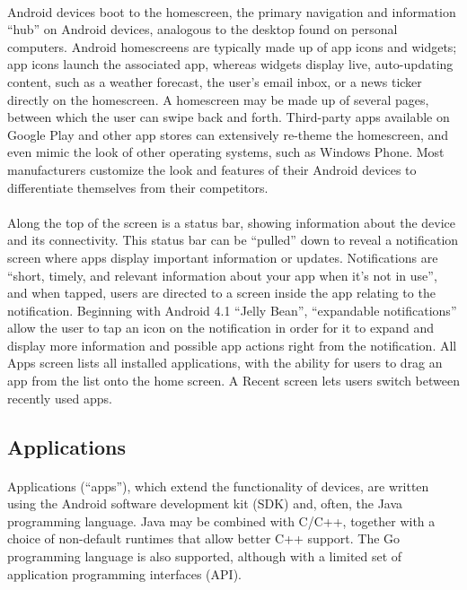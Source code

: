 \documentclass[a4paper,12pt]{report}
\begin{document}
\paragraph{}Android devices boot to the homescreen, the primary navigation and information ``hub'' on Android devices, analogous to the desktop found on personal computers. Android homescreens are typically made up of app icons and widgets; app icons launch the associated app, whereas widgets display live, auto-updating content, such as a weather forecast, the user's email inbox, or a news ticker directly on the homescreen. A homescreen may be made up of several pages, between which the user can swipe back and forth. Third-party apps available on Google Play and other app stores can extensively re-theme the homescreen, and even mimic the look of other operating systems, such as Windows Phone. Most manufacturers customize the look and features of their Android devices to differentiate themselves from their competitors.
\paragraph{}Along the top of the screen is a status bar, showing information about the device and its connectivity. This status bar can be ``pulled'' down to reveal a notification screen where apps display important information or updates. Notifications are ``short, timely, and relevant information about your app when it’s not in use'', and when tapped, users are directed to a screen inside the app relating to the notification. Beginning with Android 4.1 ``Jelly Bean'', ``expandable notifications'' allow the user to tap an icon on the notification in order for it to expand and display more information and possible app actions right from the notification. All Apps screen lists all installed applications, with the ability for users to drag an app from the list onto the home screen. A Recent screen lets users switch between recently used apps.
\subsection{Applications}
\paragraph{}Applications (``apps''), which extend the functionality of devices, are written using the Android software development kit (SDK) and, often, the Java programming language. Java may be combined with C/C++, together with a choice of non-default runtimes that allow better C++ support. The Go programming language is also supported, although with a limited set of application programming interfaces (API).
\end{document}

